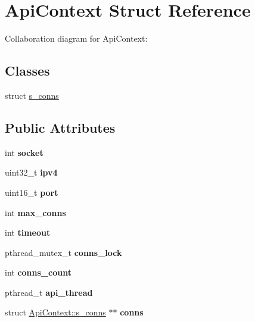 \hypertarget{struct_api_context}{}\section{Api\+Context Struct Reference}
\label{struct_api_context}


Collaboration diagram for Api\+Context\+:
\subsection*{Classes}
\begin{DoxyCompactItemize}
\item 
struct \mbox{\hyperlink{struct_api_context_1_1s__conns}{s\+\_\+conns}}
\end{DoxyCompactItemize}
\subsection*{Public Attributes}
\begin{DoxyCompactItemize}
\item 
\mbox{\label{struct_api_context_ad497162860b03bc10f87f72c1da8e39b}} 
int {\bfseries socket}
\item 
\mbox{\label{struct_api_context_a973ac8c6197b517df89f1638ffd00052}} 
uint32\+\_\+t {\bfseries ipv4}
\item 
\mbox{\label{struct_api_context_ac761ec5af48e098645822f3d4b1b31dd}} 
uint16\+\_\+t {\bfseries port}
\item 
\mbox{\label{struct_api_context_a946585c56fb3be67269d3522ca8dce3f}} 
int {\bfseries max\+\_\+conns}
\item 
\mbox{\label{struct_api_context_adf0682f734949371d803339b7ee181fc}} 
int {\bfseries timeout}
\item 
\mbox{\label{struct_api_context_a305dc1c5eb5574b11c61ac8ab8bc4aa2}} 
pthread\+\_\+mutex\+\_\+t {\bfseries conns\+\_\+lock}
\item 
\mbox{\label{struct_api_context_ac1a12a6951121ac708660dcdb1e83727}} 
int {\bfseries conns\+\_\+count}
\item 
\mbox{\label{struct_api_context_ada405499ddd1e92ae27432b0fffa6b62}} 
pthread\+\_\+t {\bfseries api\+\_\+thread}
\item 
\mbox{\label{struct_api_context_a425233352165f6259532c1af5921f25f}} 
struct \mbox{\hyperlink{struct_api_context_1_1s__conns}{Api\+Context\+::s\+\_\+conns}} $\ast$$\ast$ {\bfseries conns}
\end{DoxyCompactItemize}



